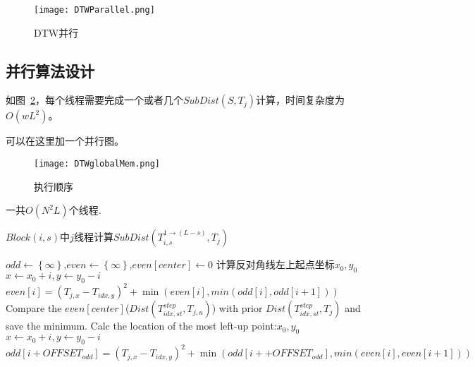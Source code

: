 \begin{figure}[H] %
	\centering
	\texttt{[image: DTWParallel.png]}
	\caption{DTW并行}
	\label{fig:DTWParallel}
\end{figure}

\subsection{并行算法设计}

如图~\ref{fig:DTWglobalMem}，每个线程需要完成一个或者几个$SubDist(S,T_j)$计算，时间复杂度为$O(wL^2)$。

可以在这里加一个并行图。

\begin{figure}[H] %
	\centering
	\texttt{[image: DTWglobalMem.png]}
	\caption{执行顺序}
	\label{fig:DTWglobalMem}
\end{figure}

一共$O(N^2L)$个线程.
\begin{algorithm}
	\caption{$Block(i,s)$中$j$线程计算$SubDist(T_{i,s}^{1\to (L-s)},T_j)$}
	\label{alg:kernel_ComputedtwsperblockForAll}
	\begin{algorithmic}[1]
					\State $odd \gets \left\lbrace \infty\right\rbrace$,$even \gets \left\lbrace \infty\right\rbrace$,$even[center] \gets 0$
						\State 计算反对角线左上起点坐标$x_0,y_0$
							\State $x \gets x_0 + i, y \gets y_0 - i$
								\State $even[i] = (T_{j,x}-T_{idx,y})^2 + \min(even[i],min(odd[i],odd[i+1]))$
							\EndIf
						\EndFor
						\State Compare the $even[center]$($Dist(T_{idx,st}^{step},T_{j,u})$) with prior $Dist(T_{idx,st}^{step},T_j)$ and save the minimum.
						\State Calc the location of the most left-up point:$x_0,y_0$
							\State $x \gets x_0 + i, y \gets y_0 - i$
								\State $odd[i+OFFSET_{odd}] = (T_{j,x}-T_{idx,y})^2 + \min(odd[i++OFFSET_{odd}],min(even[i],even[i+1]))$
							\EndIf
						\EndFor
					\EndFor
				\EndFor
			\EndFor
		\EndFunction
	\end{algorithmic}
\end{algorithm}

